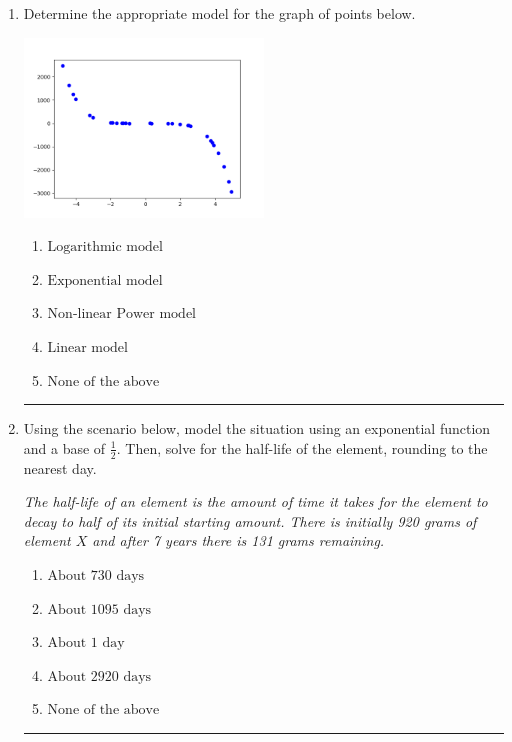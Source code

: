 \documentclass[14pt]{extbook}
\newcommand{\litem}[1]{\item#1\hspace*{-1cm}\rule{\textwidth}{0.4pt}}
\begin{document}
\begin{enumerate}
{\begin{enumerate}[label=\Alph*.]
\end{enumerate} }
\litem{
Determine the appropriate model for the graph of points below.
\begin{center}
    \includegraphics[width=0.5\textwidth]{../Figures/identifyModelGraph11A.png}
\end{center}
\begin{enumerate}[label=\Alph*.]
\item \( \text{Logarithmic model} \)
\item \( \text{Exponential model} \)
\item \( \text{Non-linear Power model} \)
\item \( \text{Linear model} \)
\item \( \text{None of the above} \)

\end{enumerate} }
\litem{
Using the scenario below, model the situation using an exponential function and a base of $\frac{1}{2}$. Then, solve for the half-life of the element, rounding to the nearest day.
\begin{center}
    \textit{ The half-life of an element is the amount of time it takes for the element to decay to half of its initial starting amount. There is initially 920 grams of element $X$ and after 7 years there is 131 grams remaining. }
\end{center}
\begin{enumerate}[label=\Alph*.]
\item \( \text{About } 730 \text{ days} \)
\item \( \text{About } 1095 \text{ days} \)
\item \( \text{About } 1 \text{ day} \)
\item \( \text{About } 2920 \text{ days} \)
\item \( \text{None of the above} \)


\end{enumerate}}
\end{enumerate}
\end{document}
